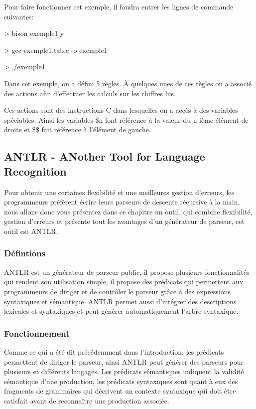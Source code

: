 \documentclass{article}
\begin{document}
Pour faire fonctionner cet exemple, il faudra entrer les lignes de commande suivantes:

> bison exemple1.y

> gcc exemple1.tab.c -o exemple1

> ./exemple1

Dans cet exemple, on a défini 5 règles. À quelques unes de ces règles on a associé des actions afin d’effectuer les calculs sur les chiffres lus.

Ces actions sont des instructions C dans lesquelles on a accès à des variables spéciables.
Ainsi les variables \$n font référence à la valeur du n-ième élément de droite et \$\$ fait référence à l’élément de gauche.

\subsection{ANTLR - ANother Tool for Language Recognition}
Pour obtenir une certaines flexibilité et une meilleures gestion d’erreurs, les programmeurs préfèrent écrire leurs parseurs de descente récursive à la main, nous allons donc vous présentez dans ce chapitre un outil, qui combine flexibilité, gestion d’erreurs  et présente tout les avantages d’un générateur de parseur, cet outil est ANTLR.
\subsubsection{Défintions}
ANTLR \cite{refANTLR} est un générateur de parseur public, il propose plusieurs fonctionnalités qui rendent son utilisation simple, il propose  des prédicats qui permettent aux programmeurs de diriger et de contrôler le parseur grâce à des expressions syntaxiques et sémantique.
ANTLR permet aussi d’intégrer des  descriptions lexicales et syntaxiques et peut générer automatiquement l’arbre syntaxique.
\subsubsection{Fonctionnement}
Comme ce qui a été dit précédemment dans l’introduction, les prédicats permettent de diriger le parseur, ainsi ANTLR peut générer des parseurs pour plusieurs et différents langages.
Les prédicats sémantiques indiquent la validité sémantique d’une production, les prédicats syntaxiques sont quant à eux des fragments de grammaires qui décrivent un contexte syntaxique qui doit être satisfait avant de reconnaître une production associée.
\end{document}
